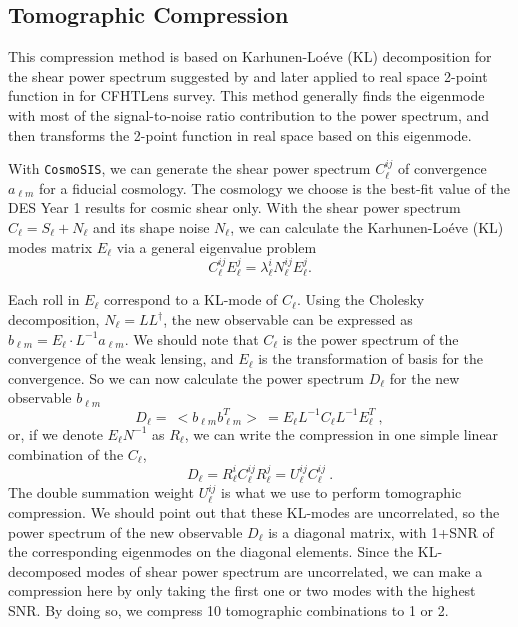 \documentclass[twocolumn]{\docclass}
\newcommand\be{\begin{equation}}
\newcommand\ee{\end{equation}}
\begin{document}
	\subsection{Tomographic Compression}
	
	This compression method is based on Karhunen-Lo\'eve (KL) decomposition for the shear power spectrum suggested by \citep{Alonso:2017hhj} and later applied to real space 2-point function in \citep{Bellini:2019ssw} for CFHTLens survey. This method generally finds the eigenmode with most of the signal-to-noise ratio contribution to the power spectrum, and then transforms the 2-point function in real space based on this eigenmode.
	
	With  {\tt CosmoSIS}, we can generate the shear power spectrum $C_{\ell}^{ij}$ of convergence $a_{\ell m}$ for a fiducial cosmology. The cosmology we choose is the best-fit value of the DES Year 1 results for cosmic shear only. With the shear power spectrum $C_{\ell}=S_{\ell}+N_{\ell}$ and its shape noise $N_{\ell}$, we can calculate the Karhunen-Lo\'eve (KL) modes matrix $E_{\ell}$ via a general eigenvalue problem 
	\be
	C^{ij}_{\ell} E^j_{\ell} = \lambda^i_{\ell} N^{ij}_{\ell} E^j_{\ell}
	.\ee
	
	Each roll in $E_{\ell}$ correspond to a KL-mode of $C_{\ell}$. Using the Cholesky decomposition, $N_{\ell} = L L^{\dagger}$, the new observable can be expressed as $b_{\ell m} = E_{\ell} \cdot L^{-1} a_{\ell m}$. We should note that $C_{\ell}$ is the power spectrum of the convergence of the weak lensing, and $E_{\ell}$ is the transformation of basis for the convergence. So we can now calculate the power spectrum $D_{\ell}$ for the new observable $b_{\ell m}$ 
	\be
	D_{\ell} =\ <b_{\ell m} b_{\ell m}^T>\ = E_{\ell} L^{-1} C_{\ell} L^{-1} E^{T}_{\ell}\
	,\ee
	or, if we denote $E_{\ell} N^{-1}$ as $R_{\ell}$, we can write the compression in one simple linear combination of the $C_{\ell}$,
	\be
	D_{\ell} = R_{\ell}^i C_{\ell}^{ij} R_{\ell}^j = U_{\ell}^{ij} C_{\ell}^{ij}\
	.\ee
	The double summation weight $U_{\ell}^{ij}$ is what we use to perform tomographic compression. We should point out that these KL-modes are uncorrelated, so the power spectrum of the new observable $D_{\ell}$ is a diagonal matrix, with 1+SNR of the corresponding eigenmodes on the diagonal elements. Since the KL-decomposed modes of shear power spectrum are uncorrelated, we can make a compression here by only taking the first one or two modes with the highest SNR. By doing so, we compress 10 tomographic combinations to 1 or 2.
	
\end{document}
